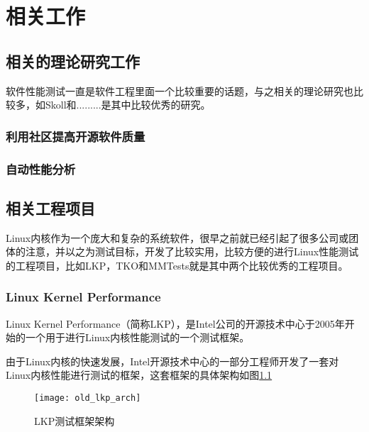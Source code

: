 
\chapter{相关工作}

\section{相关的理论研究工作}

软件性能测试一直是软件工程里面一个比较重要的话题，与之相关的理论研究也比较多，如Skoll\cite{schmidt2001leveraging}和.........是其中比较优秀的研究。

\subsection{利用社区提高开源软件质量}

\subsection{自动性能分析}

\section{相关工程项目}

Linux内核作为一个庞大和复杂的系统软件，很早之前就已经引起了很多公司或团体的注意，并以之为测试目标，开发了比较实用，比较方便的进行Linux性能测试的工程项目，比如LKP\cite{chen2007keeping}，TKO\cite{bligh2006fully}和MMTests就是其中两个比较优秀的工程项目。

\subsection{Linux Kernel Performance}

Linux Kernel Performance（简称LKP），是Intel公司的开源技术中心于2005年开始的一个用于进行Linux内核性能测试的一个测试框架。

由于Linux内核的快速发展，Intel开源技术中心的一部分工程师开发了一套对Linux内核性能进行测试的框架，这套框架的具体架构如图\ref{fig:old_lkp_arch}

\begin{figure}[H]
\centering
\texttt{[image: old\_lkp\_arch]}
\caption{LKP测试框架架构}
\label{fig:old_lkp_arch}
\end{figure}

